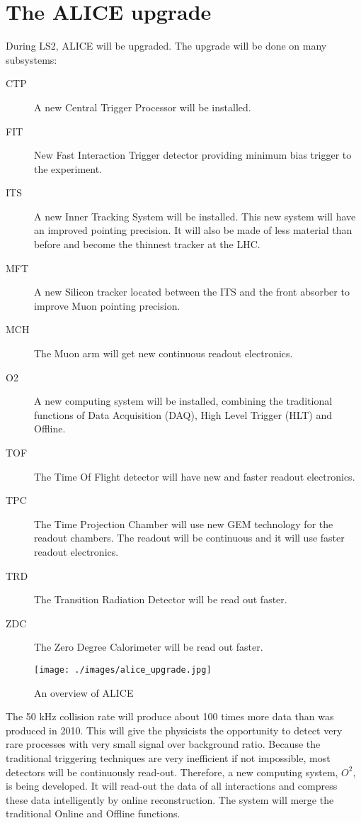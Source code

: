 \section{The ALICE upgrade}
During LS2, ALICE will be upgraded. The upgrade will be done on many subsystems:
\begin{description}
  \item[CTP] A new Central Trigger Processor will be installed.
  \item[FIT] New Fast Interaction Trigger detector providing minimum bias trigger to the experiment.
  \item[ITS] A new Inner Tracking System will be installed. This new system will have an improved pointing precision. It will also be made of less material than before and become the thinnest tracker at the LHC.
  \item[MFT] A new Silicon tracker located between the ITS and the front absorber to improve Muon pointing precision.
  \item[MCH] The Muon arm will get new continuous readout electronics.
  \item[O2] A new computing system will be installed, combining the traditional functions of Data Acquisition (DAQ), High Level Trigger (HLT) and Offline.
  \item[TOF] The Time Of Flight detector will have new and faster readout electronics.
  \item[TPC] The Time Projection Chamber will use new GEM technology for the readout chambers. The readout will be continuous and it will use faster readout electronics.
  \item[TRD] The Transition Radiation Detector will be read out faster.
  \item[ZDC] The Zero Degree Calorimeter will be read out faster.
\end{description}

\begin{figure}[h]
  \begin{center}
    \texttt{[image: ./images/alice\_upgrade.jpg]}
    \caption{An overview of ALICE}
    \label{fig:overview}
  \end{center}
\end{figure}
The 50 kHz collision rate will produce about 100 times more data than was produced in 2010. This will give the physicists the opportunity to detect very rare processes with very small signal over background ratio. Because the traditional triggering techniques are very inefficient if not impossible, most detectors will be continuously read-out. Therefore, a new computing system, $O^2$, is being developed. It will read-out the data of all interactions and compress these data intelligently by online reconstruction. The system will merge the traditional Online and Offline functions.

